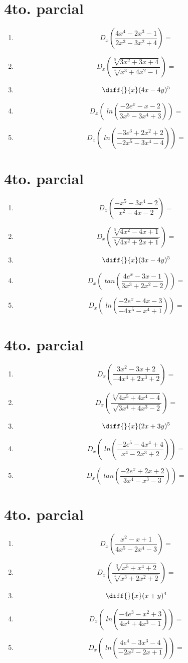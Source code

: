 \documentclass[oneside,spanish,letter]{article}
\begin{document}
\section{4to. parcial}
\begin{enumerate}
 \item $$ D_x \left( \frac{4x^4-2x^3-1}{2x^3-3x^2+4}\right)=$$
 \item $$ D_x \left( \frac{\sqrt[5]{3x^2+3x+4}}{\sqrt[5]{x^3+4x^2-1}}\right)=$$
\item $$\diff{}{x}(4x-4y)^5$$
 \item $$ D_x \left(\;ln\left( \frac{-2e^x-x-2}{3x^5-3x^4+3}\right)\right)=$$
 \item $$ D_x \left(\;ln\left( \frac{-3e^3+2x^2+2}{-2x^5-3x^4-4}\right)\right)=$$
 \end{enumerate}
  \newpage
\section{4to. parcial}
\begin{enumerate}
 \item $$ D_x \left( \frac{-x^5-3x^4-2}{x^2-4x-2}\right)=$$
 \item $$ D_x \left( \frac{\sqrt[5]{4x^2-4x+1}}{\sqrt[5]{4x^2+2x+1}}\right)=$$
\item $$\diff{}{x}(3x-4y)^5$$
 \item $$ D_x \left(\;tan\left( \frac{4e^x-3x-1}{3x^3+2x^2-2}\right)\right)=$$
 \item $$ D_x \left(\;ln\left( \frac{-2e^x-4x-3}{-4x^5-x^4+1}\right)\right)=$$
 \end{enumerate}
  \newpage
\section{4to. parcial}
\begin{enumerate}
 \item $$ D_x \left( \frac{3x^2-3x+2}{-4x^4+2x^3+2}\right)=$$
 \item $$ D_x \left( \frac{\sqrt[4]{4x^5+4x^4-4}}{\sqrt[]{3x^4+4x^3-2}}\right)=$$
\item $$\diff{}{x}(2x+3y)^5$$
 \item $$ D_x \left(\;ln\left( \frac{-2e^5-4x^4+4}{x^4-2x^3+2}\right)\right)=$$
 \item $$ D_x \left(\;tan\left( \frac{-2e^x+2x+2}{3x^4-x^3-3}\right)\right)=$$
 \end{enumerate}
  \newpage
\section{4to. parcial}
\begin{enumerate}
 \item $$ D_x \left( \frac{x^2-x+1}{4x^5-2x^4-3}\right)=$$
 \item $$ D_x \left( \frac{\sqrt[3]{x^5+x^4+2}}{\sqrt[5]{x^3+2x^2+2}}\right)=$$
\item $$\diff{}{x}(x+y)^4$$
 \item $$ D_x \left(\;ln\left( \frac{-4e^3-x^2+3}{4x^4+4x^3-1}\right)\right)=$$
 \item $$ D_x \left(\;ln\left( \frac{4e^4-3x^3-4}{-2x^2-2x+1}\right)\right)=$$
 \end{enumerate}
  \newpage
\end{document}
